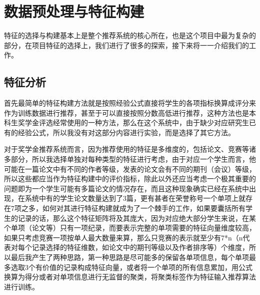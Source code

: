 %
%
%
%
%
%

\chapter{数据预处理与特征构建}

特征的选择与构建基本上是整个推荐系统的核心所在，也是这个项目中最为复杂的部分，在项目特征的选择上，我们进行了很多的探索，接下来将一一介绍我们的工作。

\section{特征分析}

首先最简单的特征构建方法就是按照经验公式直接将学生的各项指标换算成评分来作为训练数据进行推荐，甚至于可以直接按照分数高低进行推荐，这种方法也是本科生奖学金评选经常使用的一种方法，那么在这个系统中，由于缺少对应研究生已有的经验公式，所以我没有对这部分内容进行实验，而是选择了其它方法。

对于奖学金推荐系统而言，因为推荐使用的特征是多维度的，包括论文、竞赛等诸多部分，所以我选择单独对每种类型的特征进行考虑，由于对应一个学生而言，他可能在一篇论文中有不同的作者等级，发表的论文会有不同的期刊（会议）等级，所以这些都应当作为特征构建中的评价指标，除此以外还应当考虑一个极其重要的问题即为一个学生可能有多篇论文的情况存在，而且这种现象确实已经在系统中出现，在系统中有的学生论文数量达到了3篇，更有甚者在荣誉称号一个单项上就存在7项之多，如何对其进行特征构建就成为了一个棘手的工作，如果要囊括所有学生的记录的话，那么这个特征矩阵将及其庞大，因为对应绝大部分学生来说，在某个单项（论文等）只有一项纪录，而要表示完整的单项需要的特征向量维度较高，如果只考虑竞赛一项按单人最大数量来算，那么只竞赛的表示就至少有7*n（n代表对每个记录选择的特征维数，如论文中的期刊等级以及作者排序等）个维度，所以最后我产生了两种思路，第一种思路是尽可能多的保留各单项信息，每个单项最多选取3个有价值的记录构成特征向量，或者将一个单项的所有信息累加，用公式换算为得分或者对单项信息进行无监督的聚类，将聚类标签作为特征输入推荐算法进行训练。

